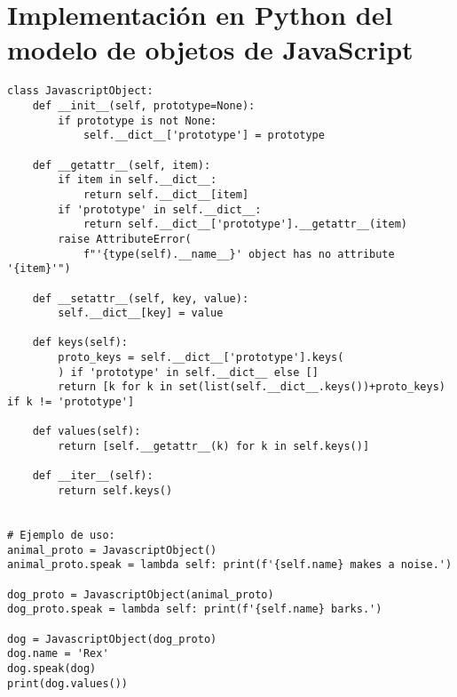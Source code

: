 \documentclass{article}
\begin{document}
\section{Implementación en Python del modelo de objetos de JavaScript}

\begin{lstlisting}
class JavascriptObject:
    def __init__(self, prototype=None):
        if prototype is not None:
            self.__dict__['prototype'] = prototype

    def __getattr__(self, item):
        if item in self.__dict__:
            return self.__dict__[item]
        if 'prototype' in self.__dict__:
            return self.__dict__['prototype'].__getattr__(item)
        raise AttributeError(
            f"'{type(self).__name__}' object has no attribute '{item}'")

    def __setattr__(self, key, value):
        self.__dict__[key] = value

    def keys(self):
        proto_keys = self.__dict__['prototype'].keys(
        ) if 'prototype' in self.__dict__ else []
        return [k for k in set(list(self.__dict__.keys())+proto_keys) if k != 'prototype']

    def values(self):
        return [self.__getattr__(k) for k in self.keys()]

    def __iter__(self):
        return self.keys()


# Ejemplo de uso:
animal_proto = JavascriptObject()
animal_proto.speak = lambda self: print(f'{self.name} makes a noise.')

dog_proto = JavascriptObject(animal_proto)
dog_proto.speak = lambda self: print(f'{self.name} barks.')

dog = JavascriptObject(dog_proto)
dog.name = 'Rex'
dog.speak(dog)
print(dog.values())
\end{lstlisting}
\end{document}
